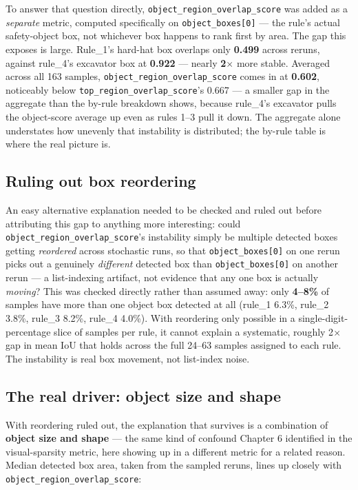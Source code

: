To answer that question directly, \texttt{object\_region\_overlap\_score} was added as a
\emph{separate} metric, computed specifically on \texttt{object\_boxes[0]} --- the rule's actual
safety-object box, not whichever box happens to rank first by area. The gap this exposes is large.
Rule\_1's hard-hat box overlaps only \textbf{0.499} across reruns, against rule\_4's excavator box
at \textbf{0.922} --- nearly \textbf{2$\times$} more stable. Averaged across all 163 samples,
\texttt{object\_region\_overlap\_score} comes in at \textbf{0.602}, noticeably below
\texttt{top\_region\_overlap\_score}'s 0.667 --- a smaller gap in the aggregate than the by-rule
breakdown shows, because rule\_4's excavator pulls the object-score average up even as rules 1--3
pull it down. The aggregate alone understates how unevenly that instability is distributed; the
by-rule table is where the real picture is.

\subsection{Ruling out box reordering}

An easy alternative explanation needed to be checked and ruled out before attributing this gap to
anything more interesting: could \texttt{object\_region\_overlap\_score}'s instability simply be
multiple detected boxes getting \emph{reordered} across stochastic runs, so that
\texttt{object\_boxes[0]} on one rerun picks out a genuinely \emph{different} detected box than
\texttt{object\_boxes[0]} on another rerun --- a list-indexing artifact, not evidence that any one
box is actually \emph{moving}? This was checked directly rather than assumed away: only
\textbf{4--8\%} of samples have more than one object box detected at all (rule\_1 6.3\%, rule\_2
3.8\%, rule\_3 8.2\%, rule\_4 4.0\%). With reordering only possible in a single-digit-percentage
slice of samples per rule, it cannot explain a systematic, roughly 2$\times$ gap in mean IoU that
holds across the full 24--63 samples assigned to each rule. The instability is real box movement,
not list-index noise.

\subsection{The real driver: object size and shape}

With reordering ruled out, the explanation that survives is a combination of \textbf{object size
and shape} --- the same kind of confound Chapter 6 identified in the visual-sparsity metric, here
showing up in a different metric for a related reason. Median detected box area, taken from the
sampled reruns, lines up closely with \texttt{object\_region\_overlap\_score}:


